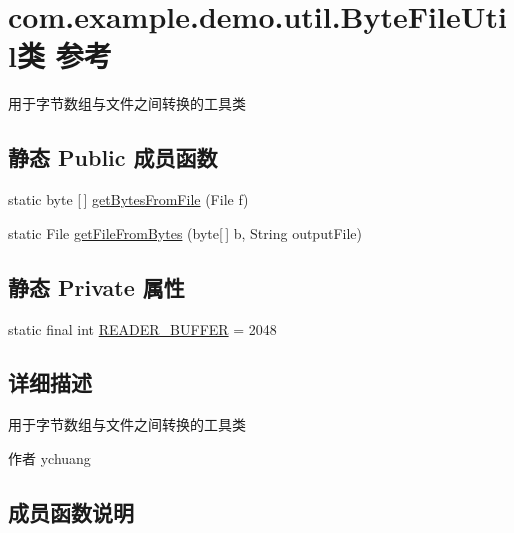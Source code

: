 \hypertarget{classcom_1_1example_1_1demo_1_1util_1_1_byte_file_util}{}\section{com.\+example.\+demo.\+util.\+Byte\+File\+Util类 参考}
\label{classcom_1_1example_1_1demo_1_1util_1_1_byte_file_util}


用于字节数组与文件之间转换的工具类  


\subsection*{静态 Public 成员函数}
\begin{DoxyCompactItemize}
\item 
static byte \mbox{[}$\,$\mbox{]} \mbox{\hyperlink{classcom_1_1example_1_1demo_1_1util_1_1_byte_file_util_abd9662ec533fee8027674ac2743171e2}{get\+Bytes\+From\+File}} (File f)
\item 
static File \mbox{\hyperlink{classcom_1_1example_1_1demo_1_1util_1_1_byte_file_util_a0fa3d181416a2f98bfd3840945089e09}{get\+File\+From\+Bytes}} (byte\mbox{[}$\,$\mbox{]} b, String output\+File)
\end{DoxyCompactItemize}
\subsection*{静态 Private 属性}
\begin{DoxyCompactItemize}
\item 
static final int \mbox{\hyperlink{classcom_1_1example_1_1demo_1_1util_1_1_byte_file_util_ade0dd26e914664c713597371bf846a4f}{R\+E\+A\+D\+E\+R\+\_\+\+B\+U\+F\+F\+ER}} = 2048
\end{DoxyCompactItemize}


\subsection{详细描述}
用于字节数组与文件之间转换的工具类 

\begin{DoxyAuthor}{作者}
ychuang 
\end{DoxyAuthor}


\subsection{成员函数说明}
\mbox{\label{classcom_1_1example_1_1demo_1_1util_1_1_byte_file_util_abd9662ec533fee8027674ac2743171e2}} 
